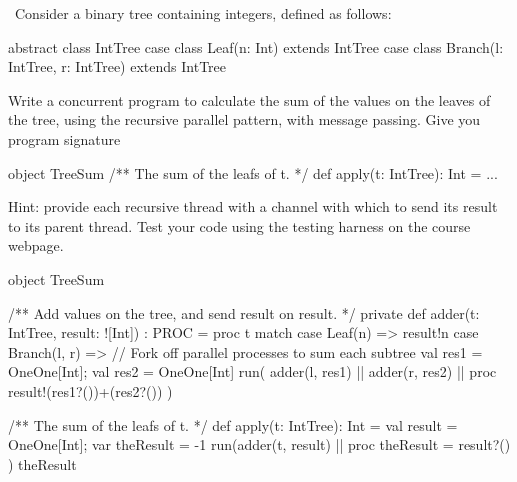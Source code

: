 \begin{question}
\Programming\
Consider a binary tree containing integers, defined as follows:
%
\begin{scala}
abstract class IntTree
case class Leaf(n: Int) extends IntTree
case class Branch(l: IntTree, r: IntTree) extends IntTree
\end{scala}
%
Write a concurrent program to calculate the sum of the values on the leaves of
the tree, using the recursive parallel pattern, with message passing.  Give
you program signature
\begin{scala}
object TreeSum{
  /** The sum of the leafs of t. */
  def apply(t: IntTree): Int = ...
}
\end{scala}
%
Hint: provide each recursive thread with a channel with which to send
its result to its parent thread.  Test your code using the testing harness on
the course webpage.
\end{question}


\begin{answer}
\begin{scala}
object TreeSum{
  /** Add values on the tree, and send result on result. */
  private def adder(t: IntTree, result: ![Int]) : PROC = proc{
    t match {
      case Leaf(n) => result!n
      case Branch(l, r) => {
	// Fork off parallel processes to sum each subtree
	val res1 = OneOne[Int]; val res2 = OneOne[Int]
	run( adder(l, res1) || adder(r, res2) || 
	  proc{ result!(res1?())+(res2?()) } )
      }
    }
  }

  /** The sum of the leafs of t. */
  def apply(t: IntTree): Int = {
    val result = OneOne[Int]; var theResult = -1
    run(adder(t, result) || proc{ theResult = result?() }) 
    theResult
  }
}
\end{scala}





\end{answer}
